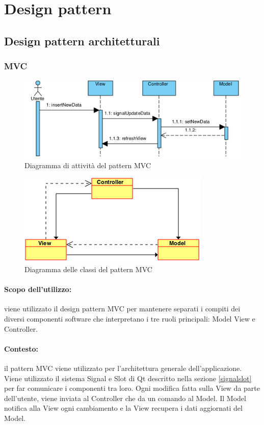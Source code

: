 \section{Design pattern}
\label{design_patt}
\subsection{Design pattern architetturali}
\label{patt_arch}
\subsubsection{MVC}
\label{arch_mvc}
	\begin{figure}[!h]
		\centering
		\includegraphics[width=0.8\linewidth]{./Content/Immagini/SimpleModelViewSequence.png}
		\caption{Diagramma di attività del pattern MVC}
		\label{img_MVCS}
	\end{figure}
	
	\begin{figure}[!h]
		\centering
		\includegraphics[width=0.8\linewidth]{./Content/Immagini/SimpleMVClassDiagram.png}
		\caption{Diagramma delle classi del pattern MVC}
		\label{img_MVCC}
	\end{figure}
	
\paragraph{Scopo dell'utilizzo:} viene utilizzato il design pattern\glossario{} MVC per mantenere separati i compiti dei diversi componenti software che interpretano i tre ruoli principali: Model View e Controller.
\paragraph{Contesto:} il pattern MVC viene utilizzato per l'architettura generale dell'applicazione. Viene utilizzato il sistema Signal e Slot di Qt\g{} descritto nella sezione \ref{signalslot} per far comunicare i componenti tra loro.
Ogni modifica fatta sulla View da parte dell'utente, viene inviata al Controller che da un comando al Model. Il Model notifica alla View ogni cambiamento e la View recupera i dati aggiornati del Model.

